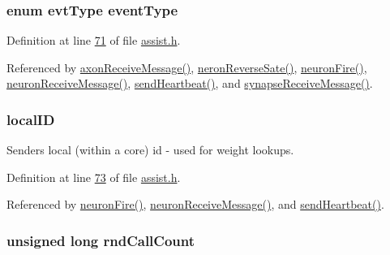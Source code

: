 \subsubsection[{event\+Type}]{\setlength{\rightskip}{0pt plus 5cm}enum {\bf evt\+Type} event\+Type}\label{struct_msg___data_a015b6eb45982e1842ee8fc389a099ced}


Definition at line \hyperlink{assist_8h_source_l00071}{71} of file \hyperlink{assist_8h_source}{assist.\+h}.



Referenced by \hyperlink{axon_8c_source_l00011}{axon\+Receive\+Message()}, \hyperlink{neuron_8c_source_l00232}{neron\+Reverse\+Sate()}, \hyperlink{neuron_8c_source_l00167}{neuron\+Fire()}, \hyperlink{neuron_8c_source_l00103}{neuron\+Receive\+Message()}, \hyperlink{neuron_8c_source_l00179}{send\+Heartbeat()}, and \hyperlink{synapse_8c_source_l00011}{synapse\+Receive\+Message()}.

\hypertarget{struct_msg___data_aefc820e92a74047ec7ed74c1c45f818f}{}
\subsubsection[{local\+I\+D}]{ local\+I\+D}\label{struct_msg___data_aefc820e92a74047ec7ed74c1c45f818f}


Sender\textquotesingle{}s local (within a core) id -\/ used for weight lookups. 



Definition at line \hyperlink{assist_8h_source_l00073}{73} of file \hyperlink{assist_8h_source}{assist.\+h}.



Referenced by \hyperlink{neuron_8c_source_l00167}{neuron\+Fire()}, \hyperlink{neuron_8c_source_l00103}{neuron\+Receive\+Message()}, and \hyperlink{neuron_8c_source_l00179}{send\+Heartbeat()}.

\hypertarget{struct_msg___data_a2e49a6bcc6c45ade722f746b1ea707f2}{}
\subsubsection[{rnd\+Call\+Count}]{\setlength{\rightskip}{0pt plus 5cm}unsigned long rnd\+Call\+Count}\label{struct_msg___data_a2e49a6bcc6c45ade722f746b1ea707f2}


